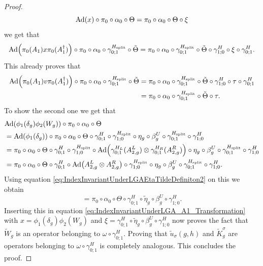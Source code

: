 \documentclass[12pt,a4paper,twoside]{article}
\let\originalleft\left
\let\originalright\right
\renewcommand{\left}{\mathopen{}\mathclose\bgroup\originalleft}
\renewcommand{\right}{\aftergroup\egroup\originalright}
\newcommand{\Ad}[1]{\textrm{Ad}\left(#1\right)}
\theoremstyle{definition}
\numberwithin{equation}{section}
\begin{document}
\begin{proof}
	\begin{equation}
		\Ad{x}\circ\pi_0\circ\alpha_0\circ\Theta=\pi_0\circ\alpha_0\circ\Theta\circ\xi
	\end{equation}
	we get that
	\begin{equation}\label{eq:IndexInvariantUnderLGA_A1_Transformation}
		\Ad{\pi_0(A_1)x\pi_0(A_1^\dagger)}\circ\pi_0\circ\alpha_0\circ\gamma^{H_\text{split}}_{0;1}\circ\tilde{\Theta}=\pi_0\circ\alpha_0\circ\gamma^{H_\text{split}}_{0;1}\circ\tilde{\Theta}\circ\gamma^H_{1;0}\circ\xi\circ\gamma^H_{0;1}.
	\end{equation}
	This already proves that
	\begin{align}
		\Ad{\pi_0(A_1)v\pi_0(A_1^\dagger)}\circ\pi_0\circ\alpha_0\circ\gamma^{H_\text{split}}_{0;1}\circ\tilde{\Theta}&=\pi_0\circ\alpha_0\circ\gamma^{H_\text{split}}_{0;1}\circ\tilde{\Theta}\circ\gamma^H_{1;0}\circ\tau\circ\gamma^H_{0;1}\\
		&=\pi_0\circ\alpha_0\circ\gamma^{H_\text{split}}_{0;1}\circ\tilde{\Theta}\circ\tau.
	\end{align}
	To show the second one we get that
	\begin{align}
		&\Ad{\phi_1(\delta_g)\phi_2(W_g)}\circ\pi_0\circ\alpha_0\circ\Theta\\
		&=\Ad{\phi_1(\delta_g)}\circ\pi_0\circ\alpha_0\circ\Theta\circ\gamma^{H}_{0;1}\circ\gamma^{H_\text{split}}_{1;0}\circ\eta_g\circ\beta_g^U\circ\gamma^{H_\text{split}}_{0;1}\circ\gamma^H_{1;0}\\
		&=\pi_0\circ\alpha_0\circ\Theta\circ\gamma^{H}_{0;1}\circ\gamma^{H_\text{split}}_{1;0}\circ\Ad{\gamma^{H_L}_{0;1}(A_{2,g}^L)\otimes\gamma^{H_R}_{0;1}(A_{2,g}^R)}\circ\eta_g\circ\beta_g^U\circ\gamma^{H_\text{split}}_{0;1}\circ\gamma^H_{1;0}\\
		&=\pi_0\circ\alpha_0\circ\Theta\circ\gamma^{H}_{0;1}\circ\Ad{A_{2,g}^L\otimes A_{2,g}^R}\circ\gamma^{H_\text{split}}_{1;0}\circ\eta_g\circ\beta_g^U\circ\gamma^{H_\text{split}}_{0;1}\circ\gamma^H_{1;0}.
	\end{align}
	Using equation \eqref{eq:IndexInvariantUnderLGAEtaTildeDefiniton2} on this we obtain
	\begin{equation}
		=\pi_0\circ\alpha_0\circ\Theta\circ\gamma^H_{0;1}\circ\tilde{\eta}_g\circ\beta_g^U\circ\gamma^H_{1;0}.
	\end{equation}
	Inserting this in equation \eqref{eq:IndexInvariantUnderLGA_A1_Transformation} with $x=\phi_1(\delta_g)\phi_2(W_g)$ and $\xi=\gamma^H_{0;1}\circ\tilde{\eta}_g\circ\beta_g^U\circ\gamma^H_{1;0}$ now proves the fact that $\tilde{W}_g$ is an operator belonging to $\omega\circ\gamma^H_{0;1}$. Proving that $\tilde u_\sigma(g,h)$ and $\tilde{K}_g^\sigma$ are operators belonging to $\omega\circ\gamma_{0;1}^H$ is completely analogous. This concludes the proof.
\end{proof}
\end{document}
